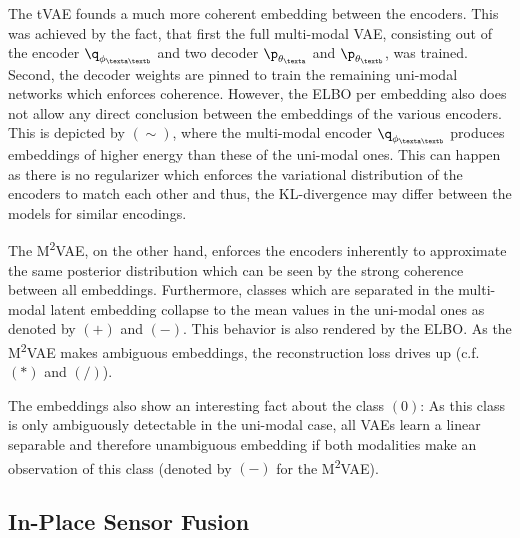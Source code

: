 The tVAE founds a much more coherent embedding between the encoders.
%
This was achieved by the fact, that first the full multi-modal VAE, consisting out of the encoder $\q_{\phi_{\texta\textb}}$ and two decoder $\p_{\theta_{\texta}}$ and $\p_{\theta_{\textb}}$, was trained.
%
Second, the decoder weights are pinned to train the remaining uni-modal networks which enforces coherence.
%
However, the ELBO per embedding also does not allow any direct conclusion between the embeddings of the various encoders. 
%
This is depicted by $(\sim)$, where the multi-modal encoder $\q_{\phi_{\texta\textb}}$ produces embeddings of higher energy than these of the uni-modal ones.
%
This can happen as there is no regularizer which enforces the variational distribution of the encoders to match each other and thus, the KL-divergence may differ between the models for similar encodings.

The M\textsuperscript{2}VAE, on the other hand, enforces the encoders inherently to approximate the same posterior distribution which can be seen by the strong coherence between all embeddings.
%
Furthermore, classes which are separated in the multi-modal latent embedding collapse to the mean values in the uni-modal ones as denoted by $(+)$ and $(-)$.
%
This behavior is also rendered by the ELBO.
%
As the M\textsuperscript{2}VAE makes ambiguous embeddings, the reconstruction loss drives up (c.f. $(*)$ and $(/)$).
%

The embeddings also show an interesting fact about the class $(0)$:
%
As this class is only ambiguously detectable in the uni-modal case, all VAEs learn a linear separable and therefore unambiguous embedding if both modalities make an observation of this class (denoted by $(-)$ for the M\textsuperscript{2}VAE).

%


%
%


\subsection{In-Place Sensor Fusion}

